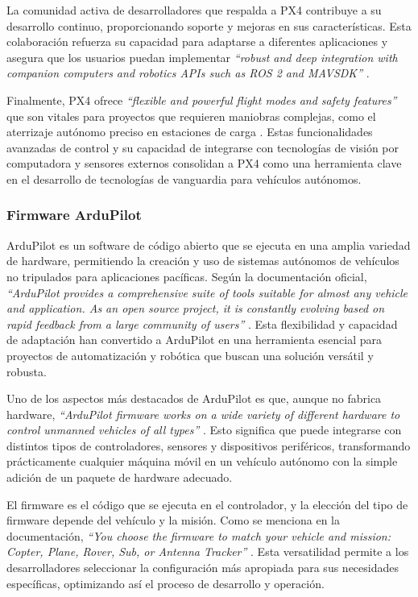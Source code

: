     La comunidad activa de desarrolladores que respalda a PX4 contribuye a su desarrollo continuo, proporcionando soporte y mejoras en sus características. Esta colaboración refuerza su capacidad para adaptarse a diferentes aplicaciones y asegura que los usuarios puedan implementar \textit{``robust and deep integration with companion computers and robotics APIs such as ROS 2 and MAVSDK''} \cite{px4_docs}.

    Finalmente, PX4 ofrece \textit{``flexible and powerful flight modes and safety features''} que son vitales para proyectos que requieren maniobras complejas, como el aterrizaje autónomo preciso en estaciones de carga \cite{px4_docs}. Estas funcionalidades avanzadas de control y su capacidad de integrarse con tecnologías de visión por computadora y sensores externos consolidan a PX4 como una herramienta clave en el desarrollo de tecnologías de vanguardia para vehículos autónomos.

    
    \subsubsection{Firmware ArduPilot}
    ArduPilot es un software de código abierto que se ejecuta en una amplia variedad de hardware, permitiendo la creación y uso de sistemas autónomos de vehículos no tripulados para aplicaciones pacíficas. Según la documentación oficial, \textit{“ArduPilot provides a comprehensive suite of tools suitable for almost any vehicle and application. As an open source project, it is constantly evolving based on rapid feedback from a large community of users”} \cite{ardupilot_docs}. Esta flexibilidad y capacidad de adaptación han convertido a ArduPilot en una herramienta esencial para proyectos de automatización y robótica que buscan una solución versátil y robusta.

    Uno de los aspectos más destacados de ArduPilot es que, aunque no fabrica hardware, \textit{“ArduPilot firmware works on a wide variety of different hardware to control unmanned vehicles of all types”} \cite{ardupilot_docs}. Esto significa que puede integrarse con distintos tipos de controladores, sensores y dispositivos periféricos, transformando prácticamente cualquier máquina móvil en un vehículo autónomo con la simple adición de un paquete de hardware adecuado.

    El firmware es el código que se ejecuta en el controlador, y la elección del tipo de firmware depende del vehículo y la misión. Como se menciona en la documentación, \textit{“You choose the firmware to match your vehicle and mission: Copter, Plane, Rover, Sub, or Antenna Tracker”} \cite{ardupilot_docs}. Esta versatilidad permite a los desarrolladores seleccionar la configuración más apropiada para sus necesidades específicas, optimizando así el proceso de desarrollo y operación.

